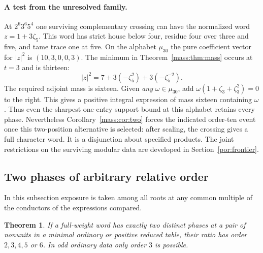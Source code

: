 \documentclass[11pt,a4paper]{article}
\numberwithin{equation}{section}
\newtheorem{theorem}{Theorem}[section]
\theoremstyle{remark}
\begin{document}
\paragraph{A test from the unresolved family.}
At $2^6 3^6 5^4$ one surviving complementary crossing can have the
normalized word $z=1+3\zeta_5$. This word has strict house below four,
residue four over three and five, and tame trace one at five. On the
alphabet $\mu_{30}$ the pure coefficient vector for $|z|^2$ is
$(10,3,0,0,3)$. The minimum in Theorem~\ref{mass:thm:mass} occurs at
$t=3$ and is thirteen:
\[
             |z|^2=7+3(-\zeta_5^2)+3(-\zeta_5^{-2}).
\]
The required adjoint mass is sixteen. Given \emph{any} $\omega\in\mu_{30}$,
add $\omega(1+\zeta_3+\zeta_3^2)=0$ to the right. This gives a positive
integral expression of mass sixteen containing $\omega$. Thus even the
sharpest one-entry support bound at this alphabet retains every phase.
Nevertheless Corollary~\ref{mass:cor:two} forces the indicated order-ten
event once this two-position alternative is selected: after scaling,
the crossing gives a full character word. It is a disjunction about
specified products. The joint restrictions on the surviving modular data are developed in Section~\ref{por:frontier}.

\subsection{Two phases of arbitrary relative order}\label{found:S:4}
In this subsection exposure is taken among all roots at any common
multiple of the conductors of the expressions compared.

\begin{theorem}\label{found:S:4.1}\label{found:S:key:thm:two-phases}
If a full-weight word has exactly two distinct phases at a pair of
nonunits in a minimal ordinary or positive reduced table, their ratio
has order $2,3,4,5$ or $6$. In odd ordinary data only order $3$ is possible.
\end{theorem}
\end{document}
